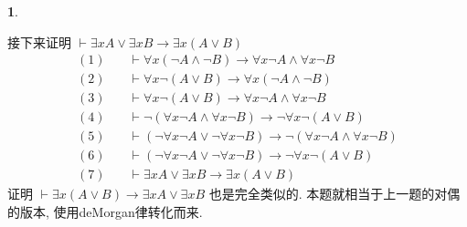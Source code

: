 \documentclass[a4paper, 12pt]{ctexbook} %
\theoremstyle{plain}
\theoremstyle{definition}
\newtheorem{problem}{}
\theoremstyle{remark}
\begin{document}
\begin{problem}
\begin{enumerate}
接下来证明 $\vdash \exists x A \vee \exists x B \to\exists x \left(A \vee B \right) $
\begin{align*}
(1) \quad &\vdash \forall x \left(\neg A \wedge \neg B \right) \to  \forall  x \neg A \wedge \forall  x \neg B \tag{上一问的结论}\\
(2) \quad &\vdash \forall  x \neg\left(A \vee B\right) \to \forall  x \left(\neg A \wedge \neg B \right) \tag{刚刚证明的结论}\\
(3) \quad &\vdash \forall x \neg\left(A \vee B \right) \to \forall  x \neg A \wedge \forall  x \neg B \tag{(1)(2)三段论}\\
(4) \quad &\vdash \neg \left(\forall  x \neg A \wedge \forall  x \neg B \right) \to \neg \forall  x \neg \left(A \vee B \right) \tag{逆否}\\
(5) \quad &\vdash \left(\neg \forall  x \neg A \vee \neg \forall  x \neg B \right) \to \neg \left(\forall  x \neg A \wedge \forall  x \neg B \right) \\
(6) \quad &\vdash \left(\neg \forall  x \neg A \vee \neg \forall x \neg B\right) \to \neg \forall  x \neg \left(A \vee B \right) \tag{(4)(5)三段论}\\
(7) \quad &\vdash \exists x A \vee \exists x B \to \exists x \left(A \vee B \right) 
\end{align*}
证明 $\vdash \exists x \left(A \vee B \right) \to \exists x A \vee \exists x B $ 也是完全类似的. 本题就相当于上一题的对偶的版本, 使用deMorgan律转化而来. 
\end{enumerate}  
\end{problem}
\end{document}
